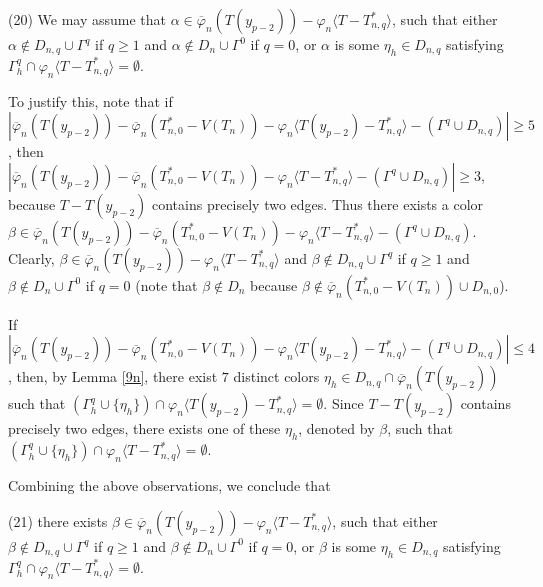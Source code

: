 \documentclass[11pt]{article}
\newcommand{\phibar}{\overline{\varphi}}
\begin{document}
(20) We may assume that $\alpha\in\phibar_n(T(y_{p-2}))-\varphi_n \langle T - T_{n,q}^* \rangle$, such that 
either $\alpha\notin D_{n,q}\cup\Gamma^{q}$ if $q \ge 1$ and $\alpha\notin D_{n}\cup\Gamma^{0}$ if $q=0$, 
or $\alpha$ is some $\eta_{h}\in D_{n,q}$ satisfying $\Gamma^{q}_h \cap \varphi_n \langle T - T_{n,q}^* \rangle=\emptyset$.

To justify this, note that if $|\overline{\varphi}_n(T(y_{p-2}))- \phibar_n(T_{n,0}^*-V(T_n)) - \varphi_n \langle 
T(y_{p-2}) - T_{n,q}^* \rangle - (\Gamma^{q}\cup D_{n,q}) |\ge  5$, then 
$|\overline{\varphi}_n(T(y_{p-2}))- \phibar_n(T_{n,0}^*-V(T_n)) - \varphi_n \langle 
T - T_{n,q}^* \rangle -(\Gamma^{q}\cup D_{n,q}) |\ge 3$, because $T-T(y_{p-2})$ contains precisely two edges.
Thus there exists a color $\beta \in \overline{\varphi}_n(T(y_{p-2}))- \phibar_n(T_{n,0}^*-V(T_n)) - 
\varphi_n \langle T - T_{n,q}^* \rangle- (\Gamma^{q}\cup D_{n,q})$. Clearly,
$\beta\in\phibar_n(T(y_{p-2}))-\varphi_n \langle T - T_{n,q}^* \rangle$ and
$\beta\notin D_{n,q}\cup\Gamma^{q}$ if $q \ge 1$ and $\beta \notin D_{n}\cup\Gamma^{0}$ if $q=0$ 
(note that $\beta \notin D_{n}$ because $\beta \notin \phibar_n(T_{n,0}^*-V(T_n)) \cup D_{n,0}$).

If $|\overline{\varphi}_n(T(y_{p-2}))- \phibar_n(T_{n,0}^*-V(T_n)) - \varphi_n \langle 
T(y_{p-2}) - T_{n,q}^* \rangle -(\Gamma^{q}\cup D_{n,q}) |\le 4 $, then, by Lemma \ref{9n}, there exist $7$ distinct 
colors $\eta_{h}\in D_{n,q}\cap \phibar_n(T(y_{p-2}))$ such that  $(\Gamma^{q}_h \cup \{\eta_{h}\})
\cap \varphi_n \langle T(y_{p-2}) - T_{n,q}^* \rangle=\emptyset$. Since $T-T(y_{p-2})$ contains precisely two edges,
there exists one of these $\eta_{h}$, denoted by $\beta$, such that $(\Gamma^{q}_h \cup \{\eta_{h}\})
\cap \varphi_n \langle T - T_{n,q}^* \rangle=\emptyset$.

Combining the above observations, we conclude that

(21) there exists $\beta \in\phibar_n(T(y_{p-2}))-\varphi_n \langle T - T_{n,q}^* \rangle$, such that 
either $\beta \notin D_{n,q}\cup\Gamma^{q}$ if $q \ge 1$ and $\beta \notin D_{n}\cup\Gamma^{0}$ if $q=0$, 
or $\beta$ is some $\eta_{h}\in D_{n,q}$ satisfying $\Gamma^{q}_h \cap \varphi_n \langle T - T_{n,q}^* \rangle=\emptyset$.
\end{document}
